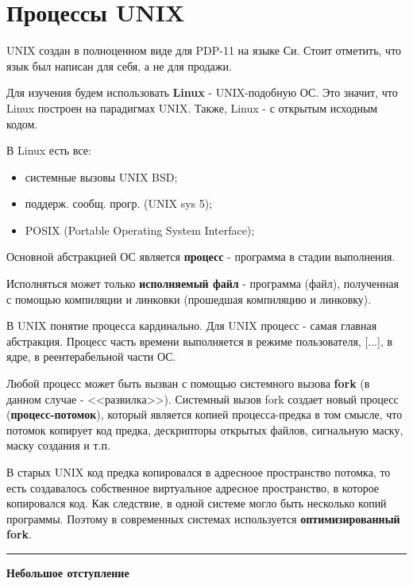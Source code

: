 \documentclass[14pt, a4paper]{article}
\begin{document}
	\section*{Процессы UNIX}
	
	UNIX создан в полноценном виде для PDP-11 на языке Си. Стоит отметить, что язык был написан для себя, а не для продажи.
	
	Для изучения будем использовать {\bf Linux} - UNIX-подобную ОС. Это значит, что Linux построен на парадигмах UNIX. Также, Linux - с открытым исходным кодом.
	
	В Linux есть все:
	
	\begin{itemize}
		\item системные вызовы UNIX BSD;
		
		\item поддерж. сообщ. прогр. (UNIX sys 5);
		
		\item POSIX (Portable Operating System Interface);
	\end{itemize}

	Основной абстракцией ОС является {\bf процесс} - программа в стадии выполнения.
	
	Исполняться может только {\bf исполняемый файл} - программа (файл), полученная с помощью компиляции и линковки (прошедшая компиляцию и линковку).
	
	В UNIX понятие процесса кардинально. Для UNIX процесс - самая главная абстракция. Процесс часть времени выполняется в режиме пользователя, [...], в ядре, в реентерабельной части ОС.
	
	Любой процесс может быть вызван с помощью системного вызова {\bf fork} (в данном случае - <<развилка>>). Системный вызов fork создает новый процесс ({\bf процесс-потомок}), который является копией процесса-предка в том смысле, что потомок копирует код предка, дескрипторы открытых файлов, сигнальную маску, маску создания и т.п.
	
	В старых UNIX код предка копировался в адресноое пространство потомка, то есть создавалось собственное виртуальное адресное пространство, в которое копировался код. Как следствие, в одной системе могло быть несколько копий программы. Поэтому в современных системах используется {\bf оптимизированный fork}.
	
	\pagebreak
	
	\noindent\rule{\textwidth}{1pt}
	
	{\bf Небольшое отступление}
	
\end{document}
